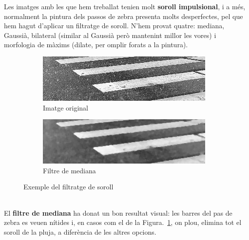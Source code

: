 \documentclass[10pt,a4paper,twocolumn,twoside]{article}
\begin{document}
Les imatges amb les que hem treballat tenien molt \textbf{soroll impulsional}, i a més, normalment la pintura dels passos de zebra presenta molts desperfectes, pel que hem hagut d'aplicar un filtratge de soroll. N'hem provat quatre: mediana, Gaussià, bilateral (similar al Gaussià però mantenint millor les vores) i morfologia de màxims (dilate, per omplir forats a la pintura).
\begin{figure}[h]
	\centering
	\begin{subfigure}{0.46\columnwidth}
		\includegraphics[width=\linewidth]{figs/neu1}
		\caption{Imatge original}
	\end{subfigure}
	\quad
	\begin{subfigure}{0.46\columnwidth}
		\includegraphics[width=\linewidth]{figs/med_neu1}
		\caption{Filtre de mediana}
	\end{subfigure}
	\caption{Exemple del filtratge de soroll}
	\label{fig:soroll}
\end{figure}
\\
El \textbf{filtre de mediana} ha donat un bon resultat visual: les barres del pas de zebra es veuen nítides i, en casos com el de la Figura.~\ref{fig:soroll}, on plou, elimina tot el soroll de la pluja, a diferència de les altres opcions.
\end{document}
